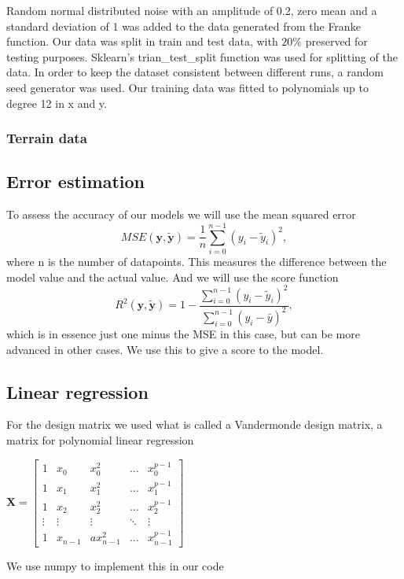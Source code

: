Random normal distributed noise with an amplitude of 0.2, zero mean and a
standard deviation of 1 was added to the data generated from the Franke
function. Our data was split in train and test data, with $20\%$ preserved for
testing purposes. Sklearn's trian\_test\_split function was used for splitting
of the data. In order to keep the dataset consistent between different runs, a
random seed generator was used. Our training data was fitted to polynomials up
to degree 12 in x and y. 



\subsubsection{Terrain data}

\subsection{Error estimation}
To assess the accuracy of our models we will use the mean squared error
$$
MSE(\boldsymbol{y},\tilde{\boldsymbol{y}}) = \frac{1}{n}
\sum_{i=0}^{n-1}(y_i-\tilde{y}_i)^2,
$$
where n is the number of datapoints. This measures the difference between the model value and the actual value. And we will use the score function
$$
R^2(\boldsymbol{y}, \tilde{\boldsymbol{y}}) = 1 - \frac{\sum_{i=0}^{n - 1} (y_i - \tilde{y}_i)^2}{\sum_{i=0}^{n - 1} (y_i - \bar{y})^2},
$$
which is in essence just one minus the MSE in this case, but can be more advanced in other cases. We use this to give a score to the model.

\subsection{Linear regression}
For the design matrix we used what is called a Vandermonde design matrix, a matrix for polynomial linear regression
\begin{center}
$\boldsymbol{X}=
\begin{bmatrix} 
1 & x_{0}&x_{0}^{2}&\dots &x_{0}^{p-1}
\\1&x_{1}&x_{1}^{2}&\dots &x_{1}^{p-1}
\\1&x_{2}&x_{2}^{2}&\dots &x_{2}^{p-1}
\\ \vdots &\vdots &\vdots &\ddots &\vdots \\
1&x_{n-1}&ax_{n-1}^{2}&\dots &x_{n-1}^{p-1}
\end{bmatrix}
$
\end{center}
We use numpy to implement this in our code


